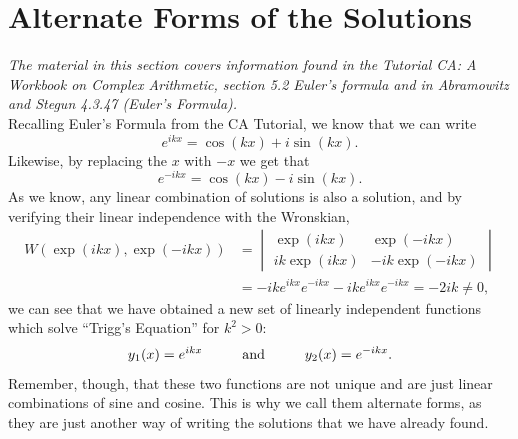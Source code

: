 \documentclass[11pt]{report}
\newcommand{\fpar}[1]{\left({#1}\right)}
\begin{document}
\section{Alternate Forms of the Solutions}

\emph{The material in this section covers information found in the Tutorial CA: A Workbook on Complex Arithmetic, section 5.2 Euler's formula and in Abramowitz and Stegun 4.3.47 (Euler's Formula).}\\

Recalling Euler's Formula from the CA Tutorial, we know that we can write
    \begin{equation*}
        e^{ikx} = \cos\fpar{kx}+i\sin\fpar{kx}.
    \end{equation*}
Likewise, by replacing the $x$ with $-x$ we get that
    \begin{equation*}
        e^{-ikx} = \cos\fpar{kx}-i\sin\fpar{kx}.
    \end{equation*}
As we know, any linear combination of solutions is also a solution, and by verifying their linear independence with the Wronskian,
    \begin{align*}
        W\fpar{\exp\fpar{ikx},\exp\fpar{-ikx}} &= \begin{vmatrix}
                                                    \exp\fpar{ikx} & \exp\fpar{-ikx} \\
                                                    ik\exp\fpar{ikx} & -ik\exp\fpar{-ikx} 
                                                   \end{vmatrix}\\
                                                  &= -ike^{ikx}e^{-ikx}-ike^{ikx}e^{-ikx} = -2ik\neq 0 ,
    \end{align*}
we can see that we have obtained a new set of linearly independent functions which solve ``Trigg's Equation'' for $k^2>0$:
    \begin{equation}
        y_1(x) = e^{ikx} \text{\hspace{1cm}and\hspace{1cm}} y_2(x) = e^{-ikx}.
    \end{equation}
Remember, though, that these two functions are not unique and are just linear combinations of sine and cosine. This is why we call them alternate forms, as they are just another way of writing the solutions that we have already found.\\
\end{document}

